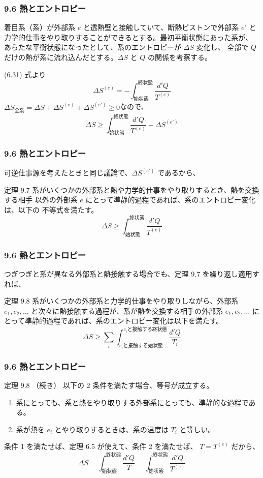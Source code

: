 \documentclass[aspectratio=149]{beamer}
\begin{document}
\begin{frame}
	\frametitle{9.6 熱とエントロピー}
	着目系（系）が外部系 \(e\) と透熱壁と接触していて、断熱ピストンで外部系 \(e'\)
	と力学的仕事をやり取りすることができるとする。最初平衡状態にあった系が、
	あらたな平衡状態になったとして、系のエントロピーが \(\Delta S\) 変化し、
	全部で \(Q\) だけの熱が系に流れ込んだとする。\(\Delta S\) と \(Q\) の関係を考察する。
	
	(6.31) 式より
	\[\Delta S^{(e)}=-\int^{\text{終状態}}_{\text{始状態}}\frac{d'Q}{T^{(e)}}\tag{9.11}\]
	\(\Delta S_\text{全系}=\Delta S+\Delta S^{(e)}+\Delta S^{(e')}\geq0\)なので、
	\[\Delta S\geq\int^{\text{終状態}}_{\text{始状態}}\frac{d'Q}{T^{(e)}}-\Delta S^{(e')}\tag{9.12}\]
\end{frame}

\begin{frame}
	\frametitle{9.6 熱とエントロピー}
	可逆仕事源を考えたときと同じ議論で、\(\Delta S^{(e')}\) であるから、
	\begin{block}{定理 9.7}
		系がいくつかの外部系と熱や力学的仕事をやり取りするとき、熱を交換する相手
		以外の外部系 \(e\) にとって準静的過程であれば、系のエントロピー変化は、以下の
		不等式を満たす。
		\[\Delta S\geq\int^{\text{終状態}}_{\text{始状態}}\frac{d'Q}{T^{(e)}}\tag{9.13}\]
	\end{block}
\end{frame}

\begin{frame}
	\frametitle{9.6 熱とエントロピー}
	つぎつぎと系が異なる外部系と熱接触する場合でも、定理 9.7 を繰り返し適用すれば、
	\begin{block}{定理 9.8}
		系がいくつかの外部系と力学的仕事をやり取りしながら、外部系 \(e_1, e_2,\dotsc\)
		と次々に熱接触する過程が、系が熱を交換する相手の外部系 \(e_1, e_2,\dotsc\) に
		とって準静的過程であれば、系のエントロピー変化は以下を満たす。
		\[\Delta S\geq\sum_i
		\int^{\text{\(e_i\)と接触する終状態}}_{\text{\(e_i\)と接触する始状態}}
		\frac{d'Q}{T_i}\tag{9.18}\]
	\end{block}
\end{frame}

\begin{frame}
	\frametitle{9.6 熱とエントロピー}
	\begin{block}{定理 9.8 （続き）}
		以下の 2 条件を満たす場合、等号が成立する。
		\begin{enumerate}
			\item 系にとっても、系と熱をやり取りする外部系にとっても、準静的な過程である。
			\item 系が熱を \(e_i\) とやり取りするときは、系の温度は \(T_i\) と等しい。
		\end{enumerate}
	\end{block}
	条件 1 を満たせば、定理 6.5 が使えて、条件 2 を満たせば、 \(T=T^{(e)}\) だから、
	\[\Delta S=\int^{\text{終状態}}_{\text{始状態}}\frac{d'Q}{T}
	=\int^{\text{終状態}}_{\text{始状態}}\frac{d'Q}{T^{(e)}}\tag{9.17}\]
\end{frame}
\end{document}
